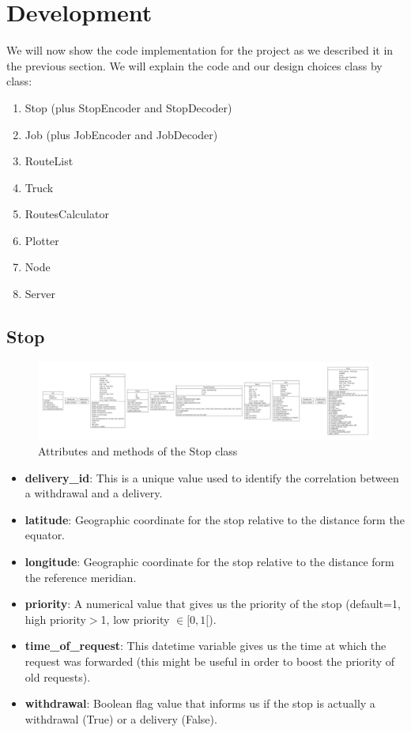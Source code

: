 \documentclass[titlepage]{article}
\begin{document}
\section{Development}
We will now show the code implementation for the project as we described it in the previous section. We will explain the code and our design choices class by class:
\begin{enumerate}
    \item Stop (plus StopEncoder and StopDecoder)
    \item Job (plus JobEncoder and JobDecoder)
    \item RouteList
    \item Truck
    \item RoutesCalculator
    \item Plotter
    \item Node
    \item Server
\end{enumerate}

\subsection{Stop}
\begin{figure}[H]
    \centering
    \includegraphics[trim={68.5cm 5cm 21.3cm 5cm}, clip, scale=.5]{img/classes.pdf}
    \caption{Attributes and methods of the Stop class}
    \label{fig:stop_class}
\end{figure}

\begin{itemize}
    \item \textbf{delivery\_id}: This is a unique value used to identify the correlation between a withdrawal and a delivery.
    \item \textbf{latitude}: Geographic coordinate for the stop relative to the distance form the equator.
    \item \textbf{longitude}: Geographic coordinate for the stop relative to the distance form the reference meridian.
    \item \textbf{priority}: A numerical value that gives us the priority of the stop (default=1, high priority$>$1, low priority $\in [0,1[$).
    \item \textbf{time\_of\_request}: This datetime variable gives us the time at which the request was forwarded (this might be useful in order to boost the priority of old requests).
    \item \textbf{withdrawal}: Boolean flag value that informs us if the stop is actually a withdrawal (True) or a delivery (False).
\end{itemize}
\end{document}
